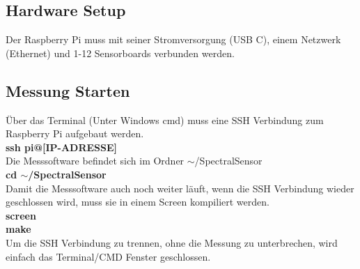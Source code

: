 \subsection{Hardware Setup}
Der Raspberry Pi muss mit seiner Stromversorgung (USB C), einem  Netzwerk (Ethernet) und 1-12 Sensorboards verbunden werden.
\subsection{Messung Starten}
Über das Terminal (Unter Windows cmd) muss eine SSH Verbindung zum Raspberry Pi aufgebaut werden.\\
\textbf{ssh pi@[IP-ADRESSE]}\\
Die Messsoftware befindet sich im Ordner $\sim$/SpectralSensor\\
\textbf{cd  $\sim$/SpectralSensor}\\
Damit die Messsoftware auch noch weiter läuft, wenn die SSH Verbindung wieder geschlossen wird, muss sie in einem Screen kompiliert werden.\\
\textbf{screen}\\
\textbf{make}\\
Um die SSH Verbindung zu trennen, ohne die Messung zu unterbrechen, wird einfach das Terminal/CMD Fenster geschlossen.\smallskip

